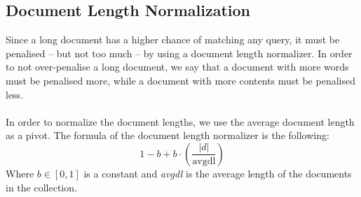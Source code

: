 \documentclass{article}
\begin{document}
\subsection{Document Length Normalization}
Since a long document has a higher chance of matching any query, it must be penalised -- but not too much -- by using a document length normalizer. In order to not over-penalise a long document, we say that a document with more words must be penalised more, while a document with more contents must be penalised less. \\ \\
In order to normalize the document lengths, we use the average document length as a pivot. The formula of the document length normalizer is the following:
\[ 1 - b + b \cdot \left( \frac{|d|}{\text{avgdl}} \right) \]
Where $b \in [0, 1]$ is a constant and \textit{avgdl} is the average length of the documents in the collection.
\end{document}
